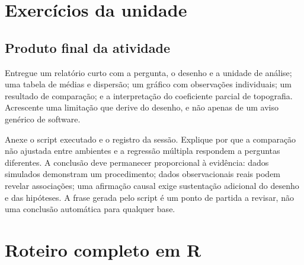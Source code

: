 \section{Exercícios da unidade}
\begin{enumerate}
\end{enumerate}
\subsection*{Produto final da atividade}
Entregue um relatório curto com a pergunta, o desenho e a unidade de análise; uma tabela de médias e dispersão; um gráfico com observações individuais; um resultado de comparação; e a interpretação do coeficiente parcial de topografia. Acrescente uma limitação que derive do desenho, e não apenas de um aviso genérico de software.

Anexe o script executado e o registro da sessão. Explique por que a comparação não ajustada entre ambientes e a regressão múltipla respondem a perguntas diferentes. A conclusão deve permanecer proporcional à evidência: dados simulados demonstram um procedimento; dados observacionais reais podem revelar associações; uma afirmação causal exige sustentação adicional do desenho e das hipóteses. A frase gerada pelo script é um ponto de partida a revisar, não uma conclusão automática para qualquer base.
\clearpage
\section{Roteiro completo em R}

